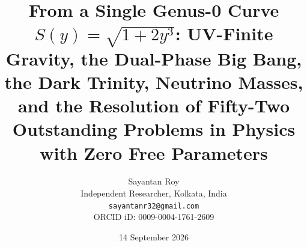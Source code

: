 \documentclass[a4paper,1pt,oneside,openany]{book}
\begin{document}
\title{\textbf{From a Single Genus-0 Curve $S(y) = \sqrt{1+2y^3}$: UV-Finite Gravity, the Dual-Phase Big Bang, the Dark Trinity, Neutrino Masses, and the Resolution of Fifty-Two Outstanding Problems in Physics with Zero Free Parameters}}

\author{Sayantan Roy\\
Independent Researcher, Kolkata, India\\
\texttt{sayantanr32@gmail.com}\\
ORCID iD: 0009-0004-1761-2609}

\date{14 September 2026}


\maketitle

\tableofcontents
\newpage
\end{document}
